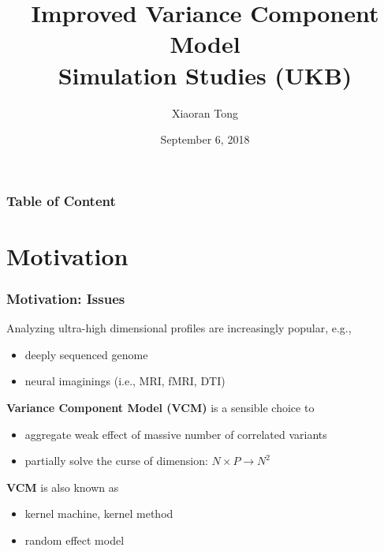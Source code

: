 \documentclass{beamer}
\title[Fast-VCM]{Improved Variance Component Model \\ Simulation Studies (\textbf{UKB})}
\author{Xiaoran Tong} %
\institute[EPI Biosta,
MSU] %
{ Michigan State University \\ %
  \medskip \textit{tongxia1@msu.edu} \\%
  \textit{qlu@epi.msu.edu} %
} \date{September 6, 2018} %
\begin{document}
\begin{frame}
  \titlepage %
\end{frame}

\begin{frame}
  \frametitle{Table of
    Content} %
  \tableofcontents
\end{frame}
\section{Motivation}
\begin{frame}\frametitle{Motivation: Issues}
  Analyzing ultra-high dimensional profiles are increasingly popular,
  e.g.,
  \begin{itemize}
  \item deeply sequenced genome
  \item neural imaginings (i.e., MRI, fMRI, DTI)
  \end{itemize}
  \textbf{Variance Component Model (VCM)} is a sensible choice to
  \begin{itemize}
  \item aggregate weak effect of massive number of correlated variants
  \item partially solve the curse of dimension: $N \times P \to N^2$
  \end{itemize}
  \textbf{VCM} is also known as
  \begin{itemize}
  \item kernel machine, kernel method
  \item random effect model
  \end{itemize}
\end{frame}
\newcommand{\fit}[1]{{\color{magenta}{#1}}}
\newcommand{\CB}[1]{{\color{blue}{#1}}}
\newcommand{\CR}[1]{{\color{red}{#1}}}
\newcommand{\green}[1]{{\color{green}{#1}}}
\end{document}
